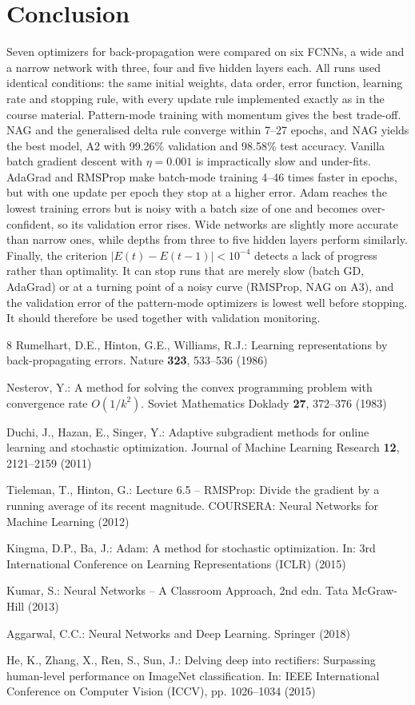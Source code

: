 \documentclass[runningheads]{llncs}
\begin{document}
\FloatBarrier
\section{Conclusion}
Seven optimizers for back-propagation were compared on six FCNNs, a wide and a narrow network with
three, four and five hidden layers each. All runs used identical conditions: the same initial
weights, data order, error function, learning rate and stopping rule, with every update rule
implemented exactly as in the course material. Pattern-mode training with momentum gives the best
trade-off. NAG and the generalised delta rule converge within 7--27 epochs, and NAG yields the best
model, A2 with 99.26\% validation and 98.58\% test accuracy. Vanilla batch gradient descent with
$\eta=0.001$ is impractically slow and under-fits. AdaGrad and RMSProp make batch-mode training 4--46
times faster in epochs, but with one update per epoch they stop at a higher error. Adam reaches the
lowest training errors but is noisy with a batch size of one and becomes over-confident, so its
validation error rises. Wide networks are slightly more accurate than narrow ones, while depths from
three to five hidden layers perform similarly. Finally, the criterion
$|E(t)-E(t-1)|<10^{-4}$ detects a lack of progress rather than optimality. It can stop runs that are
merely slow (batch GD, AdaGrad) or at a turning point of a noisy curve (RMSProp, NAG on A3), and the
validation error of the pattern-mode optimizers is lowest well before stopping. It should therefore
be used together with validation monitoring.

\begin{thebibliography}{8}
Rumelhart, D.E., Hinton, G.E., Williams, R.J.: Learning representations by back-propagating
errors. Nature \textbf{323}, 533--536 (1986)

Nesterov, Y.: A method for solving the convex programming problem with convergence rate
$O(1/k^2)$. Soviet Mathematics Doklady \textbf{27}, 372--376 (1983)

Duchi, J., Hazan, E., Singer, Y.: Adaptive subgradient methods for online learning and stochastic
optimization. Journal of Machine Learning Research \textbf{12}, 2121--2159 (2011)

Tieleman, T., Hinton, G.: Lecture 6.5 -- RMSProp: Divide the gradient by a running average of its
recent magnitude. COURSERA: Neural Networks for Machine Learning (2012)

Kingma, D.P., Ba, J.: Adam: A method for stochastic optimization. In: 3rd International Conference
on Learning Representations (ICLR) (2015)

Kumar, S.: Neural Networks -- A Classroom Approach, 2nd edn. Tata McGraw-Hill (2013)

Aggarwal, C.C.: Neural Networks and Deep Learning. Springer (2018)

He, K., Zhang, X., Ren, S., Sun, J.: Delving deep into rectifiers: Surpassing human-level
performance on ImageNet classification. In: IEEE International Conference on Computer Vision
(ICCV), pp. 1026--1034 (2015)
\end{thebibliography}
\end{document}
